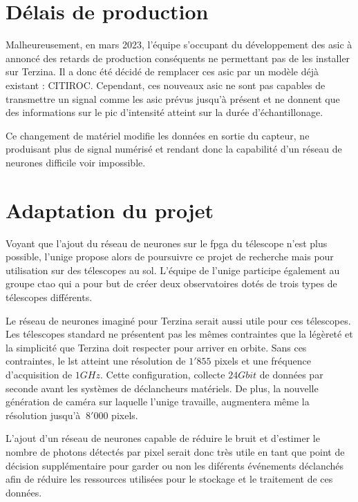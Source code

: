 \section{Délais de production}

Malheureusement, en mars 2023, l'équipe s'occupant du développement des \gls{asic} à annoncé des retards de production conséquents ne permettant pas de les installer sur Terzina.
Il a donc été décidé de remplacer ces \gls{asic} par un modèle déjà existant : CITIROC. Cependant, ces nouveaux \gls{asic} ne sont pas capables 
de transmettre un signal comme les \gls{asic} prévus jusqu'à présent et ne donnent que des informations sur le pic d'intensité atteint sur la durée d'échantillonage.


Ce changement de matériel modifie les données en sortie du capteur, ne produisant plus de signal numérisé et rendant donc la capabilité d'un réseau de neurones
difficile voir impossible.

\section{Adaptation du projet}

Voyant que l'ajout du réseau de neurones sur le \gls{fpga} du télescope n'est plus possible, l'\gls{unige} propose alors de poursuivre 
ce projet de recherche mais pour utilisation sur des télescopes au sol. L'équipe de l'\gls{unige} participe également au groupe \gls{ctao}
qui a pour but de créer deux observatoires dotés de trois types de télescopes différents.

Le réseau de neurones imaginé pour Terzina serait aussi utile pour ces télescopes.
Les télescopes standard ne présentent pas les mêmes contraintes que la légèreté et la simplicité que Terzina doit respecter pour arriver en orbite.
Sans ces contraintes, le \gls{lst} atteint une résolution de $1'855$ pixels et une fréquence d'acquisition de $1 GHz$. 
Cette configuration, collecte $24 Gbit$ de données par seconde avant les systèmes de déclancheurs matériels. \cite{LSTSpecifications}
De plus, la nouvelle génération de caméra sur laquelle l'\gls{unige} travaille, augmentera même la résolution jusqu'à $~8'000$ pixels.

L'ajout d'un réseau de neurones capable de réduire le bruit et d'estimer le nombre de photons détectés par pixel serait donc très utile en tant que 
point de décision supplémentaire pour garder ou non les diférents événements déclanchés afin de réduire les ressources utilisées pour le stockage 
et le traitement de ces données.

